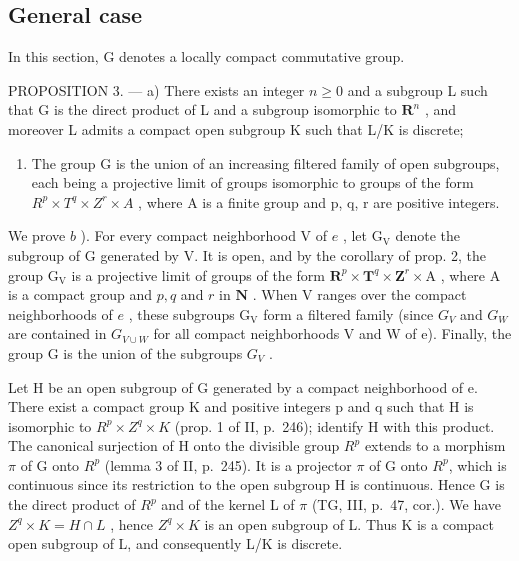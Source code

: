 \subsection{General case}

In this section, G denotes a locally compact commutative group.

PROPOSITION 3. --- a) There exists an integer \(n \geqslant 0\) and a subgroup L such that G is the direct product of L and a subgroup isomorphic to \(\mathbf{R}^n\) , and moreover L admits a compact open subgroup K such that L/K is discrete;

\begin{enumerate}
\def\labelenumi{\alph{enumi})}
\setcounter{enumi}{1}
\tightlist
\item
  The group G is the union of an increasing filtered family of open subgroups, each being a projective limit of groups isomorphic to groups of the form \(R^{p} \times T^{q} \times Z^{r} \times A\) , where A is a finite group and p, q, r are positive integers.
\end{enumerate}

We prove \(b\) ). For every compact neighborhood V of \(e\) , let \(\mathrm{G_V}\) denote the subgroup of G generated by V. It is open, and by the corollary of prop. 2, the group \(\mathrm{G_V}\) is a projective limit of groups of the form \(\mathbf{R}^p\times \mathbf{T}^q\times \mathbf{Z}^r\times \mathrm{A}\) , where A is a compact group and \(p,q\) and \(r\) in \(\mathbf{N}\) . When V ranges over the compact neighborhoods of \(e\) , these subgroups \(\mathrm{G_V}\) form a filtered family (since \(G_{V}\) and \(G_{W}\) are contained in \(G_{V\cup W}\) for all compact neighborhoods V and W of e). Finally, the group G is the union of the subgroups \(G_{V}\) .

Let H be an open subgroup of G generated by a compact neighborhood of e. There exist a compact group K and positive integers p and q such that H is isomorphic to \(R^{p} \times Z^{q} \times K\) (prop. 1 of II, p.~246); identify H with this product. The canonical surjection of H onto the divisible group \(R^{p}\) extends to a morphism \(\pi\) of G onto \(R^{p}\) (lemma 3 of II, p.~245). It is a projector \(\pi\) of G onto \(R^{p}\), which is continuous since its restriction to the open subgroup H is continuous. Hence G is the direct product of \(R^{p}\) and of the kernel L of \(\pi\) (TG, III, p.~47, cor.). We have \(Z^{q} \times K = H \cap L\) , hence \(Z^{q} \times K\) is an open subgroup of L. Thus K is a compact open subgroup of L, and consequently L/K is discrete.

